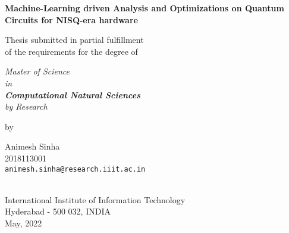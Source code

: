 \thispagestyle{empty}
\begin{center}
\vspace*{1.5cm}
{\Large \bf Machine-Learning driven Analysis and Optimizations on Quantum Circuits for NISQ-era hardware}

\vspace*{3.75cm}
{\large Thesis submitted in partial fulfillment\\}
{\large  of the requirements for the degree of \\}

\vspace*{1cm}
{\it {\large Master of Science \\ in \\ \textbf{Computational Natural Sciences} \\ by Research}\\}
    

\vspace*{1cm}
{\large by}

\vspace*{5mm}
{\large Animesh Sinha\\}
{\large 2018113001\\
{\small \tt animesh.sinha@research.iiit.ac.in}}


\vspace*{4.0cm}
{\\}
{\large International Institute of Information Technology\\}
{\large Hyderabad - 500 032, INDIA\\}
{\large May, 2022\\}
\end{center}